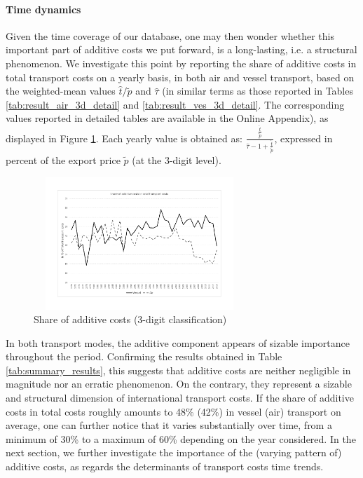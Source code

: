 \documentclass[a4paper,11pt]{article}
\begin{document}
\paragraph{Time dynamics} Given the time coverage of our database, one may then wonder whether this important part of additive costs we put forward, is a long-lasting, i.e. a structural phenomenon.
We investigate this point by reporting the share of additive costs in total transport costs on a yearly basis, in both air and vessel transport, based on the weighted-mean values $\widehat{t}/\widetilde{p}$ and $\widehat{\tau}$ (in similar terms as those reported in Tables \ref{tab:result_air_3d_detail} and \ref{tab:result_ves_3d_detail}.
The corresponding values reported in detailed tables are available in the Online Appendix), as displayed in Figure \ref{fig:part_cout_additif}.
Each yearly value is obtained as: $\frac{\frac{\widehat{t}}{\widetilde{p}}}{\widehat{\tau}-1+\frac{\widehat{t}}{\widetilde{p}}}$, expressed in percent of the export price $\widetilde{p}$ (at the 3-digit level).

\begin{figure}[htbp]
\caption{Share of additive costs (3-digit classification)}
\label{fig:part_cout_additif}
\begin{center}
\includegraphics[width=8cm, height=5cm]{Figure1_share_of_additive_in_totalTC.pdf}
\end{center}
\end{figure}


In both transport modes, the additive component appears of sizable importance throughout the period.
Confirming the results obtained in Table \ref{tab:summary_results}, this suggests that additive costs are neither negligible in magnitude nor an erratic phenomenon.
On the contrary, they represent a sizable and structural dimension of international transport costs.
If the share of additive costs in total costs roughly amounts to 48\% (42\%) in vessel (air) transport on average, one can further notice that it varies substantially over time, from a minimum of 30\% to a maximum of 60\% depending on the year considered.
In the next section, we further investigate the importance of the (varying pattern of) additive costs, as regards the determinants of transport costs time trends.
\end{document}
